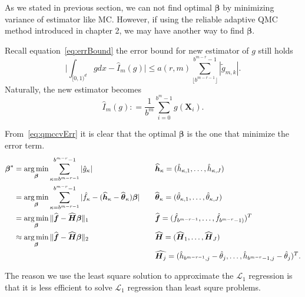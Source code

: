 \newpage
{} 

As we stated in previous section, we can not find optimal $\boldsymbol{\beta}$ by minimizing variance of estimator like MC. 
However, if using the reliable adaptive QMC method introduced in chapter 2, we may have another way to find $\boldsymbol{\beta}$.

Recall equation~\eqref{eq:errBound} the error bound for new estimator of $g$ still holds
\begin{equation}\label{eq:qmccvErr}
	\Big|\int_{[0,1)^d}gdx - \hat{I}_m(g)\Big| \leq a(r,m) \sum_{\lfloor b^{m-r-1} \rfloor}^{b^{m-r}-1} |\tilde{g}_{m,k}|.
\end{equation}
Naturally, the new estimator becomes
\begin{equation}\label{eq:estcv}
    \hat{I}_m({g}): = \frac{1}{b^m}\sum_{i=0}^{b^m-1}g(\mathbf{X}_i).
\end{equation}


From~\eqref{eq:qmccvErr} it is clear that the optimal $\boldsymbol{\beta}$ is the one that minimize the error term. 
\begin{align}
    \notag
    \boldsymbol{\beta}^*
    &=\operatorname*{arg\,min}_{\boldsymbol{\beta}}\sum_{\kappa=b^{m-r-1}}^{b^{m-r}-1} |\hat{g}_{\kappa}|
    && \quad \widehat{\boldsymbol{h}}_\kappa=(\hat{h}_{\kappa,1},\dots, \hat{h}_{\kappa,J})\\
    \label{eq:optbeta2}
    &=\operatorname*{arg\,min}_{\boldsymbol{\beta}}\sum_{\kappa=b^{m-r-1}}^{b^{m-r}-1}|\hat{f}_\kappa -(\widehat{\boldsymbol{h}}_\kappa - \widehat{\boldsymbol{\theta}}_\kappa)\boldsymbol{\boldsymbol{\beta}}|
    && \quad \widehat{\boldsymbol{\theta}}_\kappa=(\hat{\theta}_{\kappa,1},\dots,\hat{\theta}_{\kappa,J})\\
    \notag
    & =\operatorname*{arg\,min}_{\boldsymbol{\beta}}\|\widehat{\boldsymbol{f}}-\widehat{\boldsymbol{H}}\boldsymbol{\beta}\|_1
    && \quad \widehat{\boldsymbol{f}}= (\hat{f}_{b^{m-r-1}},\dots,\hat{f}_{b^{m-r}-1)})^T \\
    \notag
    & \approx\operatorname*{arg\,min}_{\boldsymbol{\beta}}\|\widehat{\boldsymbol{f}}-\widehat{\boldsymbol{H}}\boldsymbol{\beta}\|_2
    && \quad \widehat{\boldsymbol{H}}= (\widehat{\boldsymbol{H}}_1, \dots, \widehat{\boldsymbol{H}}_J)\\
    & \notag 
    &&\quad \widehat{\boldsymbol{H}_j}=(\hat{h}_{b^{m-r-1},j}-\hat{\theta}_j,\dots, \hat{h}_{b^{m-r}-1,j}-\hat{\theta}_j)^T.
\end{align}

The reason we use the least square solution to approximate the $\mathcal{L}_1$ regression is that it is less efficient to solve $\mathcal{L}_1$ regression than least squre problems.

